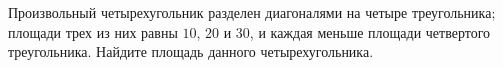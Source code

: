 \begin{ex}
	\begin{condition}
		Произвольный четырехугольник разделен диагоналями на четыре треугольника; площади трех из них равны \( 10 \), \( 20  \) и \( 30 \), и каждая меньше площади четвертого треугольника. Найдите площадь данного четырехугольника.
	\end{condition}
\end{ex}